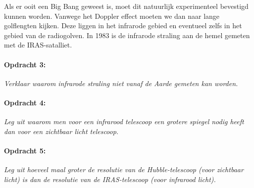 Als er ooit een Big Bang geweest is, moet dit natuurlijk experimenteel
bevestigd kunnen worden. Vanwege het Doppler effect moeten we dan
naar lange golflengten kijken. Deze liggen in het infrarode gebied
en eventueel zelfs in het gebied van de radiogolven. In 1983 is de
infrarode straling aan de hemel gemeten met de IRAS-satalliet.


\paragraph*{Opdracht 3:}

\emph{Verklaar waarom infrarode straling niet vanaf de Aarde gemeten
kan worden.}


\paragraph*{Opdracht 4:}

\emph{Leg uit waarom men voor een infrarood telescoop een grotere
spiegel nodig heeft dan voor een zichtbaar licht telescoop.}


\paragraph*{Opdracht 5:}

\emph{Leg uit hoeveel maal groter de resolutie van de Hubble-telescoop
(voor zichtbaar licht) is dan de resolutie van de IRAS-telescoop (voor
infrarood licht).}


